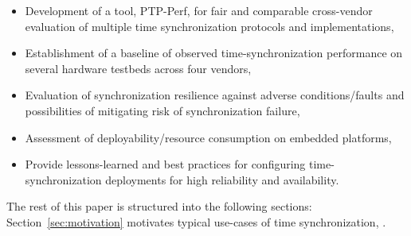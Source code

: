 \begin{itemize}
    \item Development of a tool, PTP-Perf, for fair and comparable cross-vendor evaluation of multiple time synchronization protocols and implementations,
    \item Establishment of a baseline of observed time-synchronization performance on several hardware testbeds across four vendors,
    \item Evaluation of synchronization resilience against adverse conditions/faults and possibilities of mitigating risk of synchronization failure,
    \item Assessment of deployability/resource consumption on embedded platforms,
    \item Provide lessons-learned and best practices for configuring time-synchronization deployments for high reliability and availability.
\end{itemize}

The rest of this paper is structured into the following sections: Section~\ref{sec:motivation} motivates typical use-cases of time synchronization, .